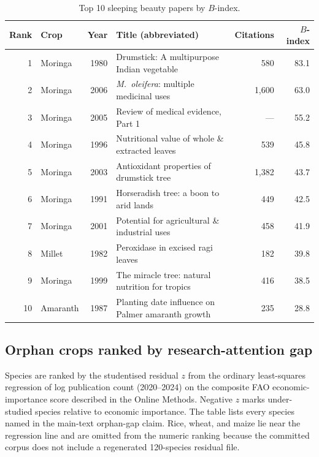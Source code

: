 \begin{table}[H]
\centering
\caption{Top 10 sleeping beauty papers by $B$-index.}
\label{tab:si-sleeping-beauty}
\begin{tabular}{rlrlrr}
\toprule
Rank & Crop & Year & Title (abbreviated) & Citations & $B$-index \\
\midrule
1  & Moringa   & 1980 & Drumstick: A multipurpose Indian vegetable            & 580   & 83.1 \\
2  & Moringa   & 2006 & \textit{M.\ oleifera}: multiple medicinal uses        & 1,600 & 63.0 \\
3  & Moringa   & 2005 & Review of medical evidence, Part 1                    & ---   & 55.2 \\
4  & Moringa   & 1996 & Nutritional value of whole \& extracted leaves         & 539   & 45.8 \\
5  & Moringa   & 2003 & Antioxidant properties of drumstick tree               & 1,382 & 43.7 \\
6  & Moringa   & 1991 & Horseradish tree: a boon to arid lands                & 449   & 42.5 \\
7  & Moringa   & 2001 & Potential for agricultural \& industrial uses          & 458   & 41.9 \\
8  & Millet    & 1982 & Peroxidase in excised ragi leaves                     & 182   & 39.8 \\
9  & Moringa   & 1999 & The miracle tree: natural nutrition for tropics        & 416   & 38.5 \\
10 & Amaranth  & 1987 & Planting date influence on Palmer amaranth growth      & 235   & 28.8 \\
\bottomrule
\end{tabular}
\end{table}



\bigskip

\subsection*{Orphan crops ranked by research-attention gap}

Species are ranked by the studentised residual $z$ from the ordinary
least-squares regression of log publication count (2020--2024) on the
composite FAO economic-importance score described in the Online Methods.
Negative $z$ marks under-studied species relative to economic importance.
The table lists every species named in the main-text orphan-gap claim.
Rice, wheat, and maize lie near the regression line and are omitted from
the numeric ranking because the committed corpus does not include a
regenerated 120-species residual file.

